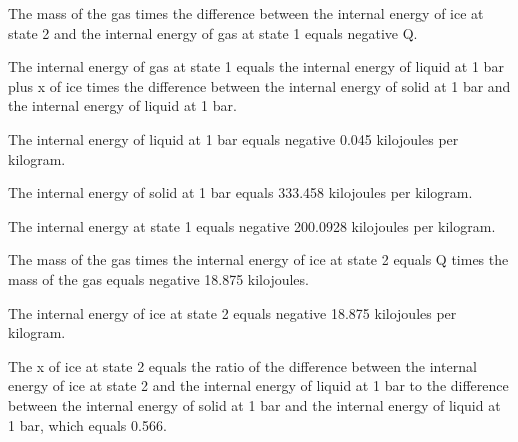 The mass of the gas times the difference between the internal energy of ice at state 2 and the internal energy of gas at state 1 equals negative Q.

The internal energy of gas at state 1 equals the internal energy of liquid at 1 bar plus x of ice times the difference between the internal energy of solid at 1 bar and the internal energy of liquid at 1 bar.

The internal energy of liquid at 1 bar equals negative 0.045 kilojoules per kilogram.

The internal energy of solid at 1 bar equals 333.458 kilojoules per kilogram.

The internal energy at state 1 equals negative 200.0928 kilojoules per kilogram.

The mass of the gas times the internal energy of ice at state 2 equals Q times the mass of the gas equals negative 18.875 kilojoules.

The internal energy of ice at state 2 equals negative 18.875 kilojoules per kilogram.

The x of ice at state 2 equals the ratio of the difference between the internal energy of ice at state 2 and the internal energy of liquid at 1 bar to the difference between the internal energy of solid at 1 bar and the internal energy of liquid at 1 bar, which equals 0.566.